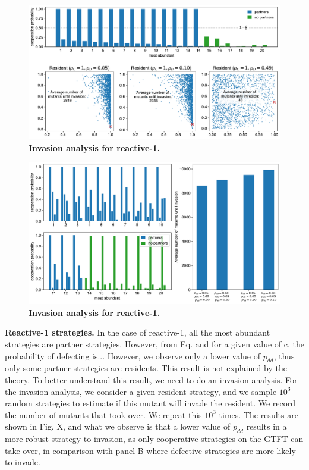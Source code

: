 \documentclass[11pt]{article}
\theoremstyle{plainCl1}
\theoremstyle{plainCl2}
\begin{document}
\begin{figure}[tbhp]
  \centering
  \includegraphics[width=\textwidth]{../../figures/siFigInvasionR1.pdf}
  \caption{\textbf{Invasion analysis for reactive-1.}
  }
\end{figure}

\begin{figure}[tbhp]
  \centering
  \includegraphics[width=\textwidth]{../../figures/siFigInvasionR2.pdf}
  \caption{\textbf{Invasion analysis for reactive-1.}
  }
\end{figure}



\noindent
\textbf{Reactive-1 strategies.} In the case of reactive-1, all the most abundant
strategies are partner strategies. However, from Eq. and for a given value of c,
the probability of defecting is... However, we observe only a lower value of \(
p_{dd} \), thus only some partner strategies are residents. This result is not
explained by the theory. To better understand this result, we need to do an
invasion analysis. For the invasion analysis, we consider a given resident
strategy, and we sample \( 10^3 \) random strategies to estimate if this mutant
will invade the resident. We record the number of mutants that took over. We
repeat this \( 10^3 \) times. The results are shown in Fig. X, and what we
observe is that a lower value of \( p_{dd} \) results in a more robust strategy
to invasion, as only cooperative strategies on the GTFT can take over, in
comparison with panel B where defective strategies are more likely to invade.
\end{document}
